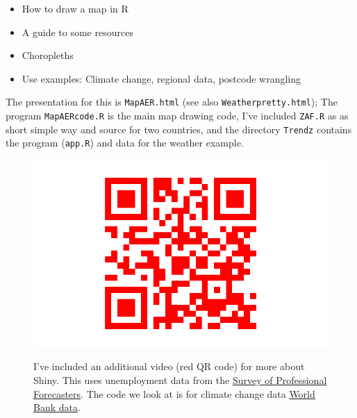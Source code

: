 \documentclass[
  letterpaper,
]{book}
\providecommand{\tightlist}{%
  \setlength{\itemsep}{0pt}\setlength{\parskip}{0pt}}\usepackage{longtable,booktabs,array}
\begin{document}
\begin{itemize}
\tightlist
\item
  How to draw a map in R
\item
  A guide to some resources
\item
  Choropleths
\item
  Use examples: Climate change, regional data, postcode wrangling
\end{itemize}

The presentation for this is \texttt{MapAER.html} (see also
\texttt{Weatherpretty.html}); The program \texttt{MapAERcode.R} is the
main map drawing code, I've included \texttt{ZAF.R} as as short simple
way and source for two countries, and the directory \texttt{Trendz}
contains the program (\texttt{app.R}) and data for the weather example.

\begin{figure}

\begin{minipage}[t]{0.50\linewidth}

{\centering 

\includegraphics{R2021_files/figure-pdf/unnamed-chunk-2-1.pdf}

}

\end{minipage}%
%
\begin{minipage}[t]{0.50\linewidth}

{\centering 

I've included an additional video (red QR code) for more about Shiny.
This uses unemployment data from the
\href{https://www.philadelphiafed.org/surveys-and-data/real-time-data-research/survey-of-professional-forecasters}{Survey
of Professional Forecasters}. The code we look at is for climate change
data \href{https://climateknowledgeportal.worldbank.org/}{World Bank
data}.

}

\end{minipage}%

\end{figure}
\end{document}
